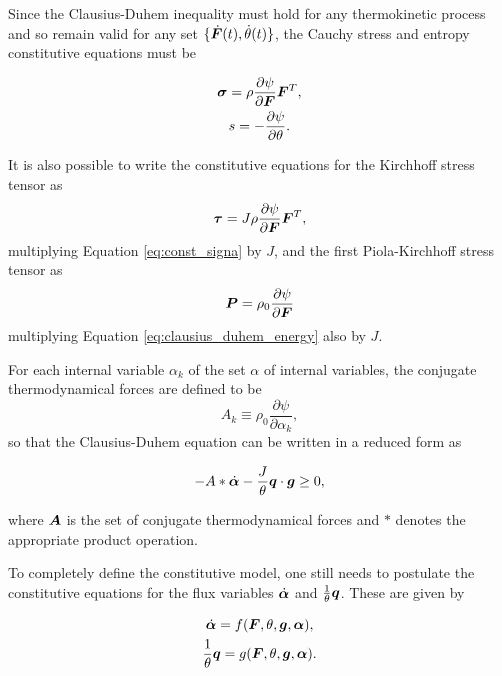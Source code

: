 Since the Clausius-Duhem inequality must hold for any thermokinetic process and so remain valid for any set $\{\dot{\bm{F}}(t),\dot \theta(t)\}$, the Cauchy stress and entropy constitutive equations must be
\begin{highlight}[innertopmargin=-5pt]
    \begin{gather}
        \bm{\sigma} = \rho \frac{\partial \psi}{\partial \bm{F}}\bm{F}^T, \label{eq:const_signa}\\
        s = -\frac{\partial \psi}{\partial \theta}.
    \end{gather}
\end{highlight}

It is also possible to write the constitutive equations for the Kirchhoff stress tensor as
\begin{equation}
    \bm{\tau} = J\rho \frac{\partial \psi}{\partial \bm{F}}\bm{F}^T,
\end{equation}
multiplying Equation \eqref{eq:const_signa} by $J$, and the first Piola-Kirchhoff stress tensor as
\begin{equation}
    \bm{P} = \rho_0 \frac{\partial \psi}{\partial \bm{F}}
\end{equation}
multiplying Equation \eqref{eq:clausius_duhem_energy} also by $J$.

For each internal variable $\alpha_k$ of the set $\alpha$ of internal variables, the conjugate thermodynamical forces are defined to be
\begin{equation}
    A_k\equiv \rho_0 \frac{\partial \psi}{\partial \alpha_k},
\end{equation}
so that the Clausius-Duhem equation can be written in a reduced form as
\begin{highlight}
    \begin{equation}
        -A*\dot{\bm{\alpha}} - \frac{J}{\theta}\bm{q}\cdot \bm{g}\geq 0,
    \end{equation}
\end{highlight}
where $\bm{A}$ is the set of conjugate thermodynamical forces and \(*\) denotes the appropriate product operation.

To completely define the constitutive model, one still needs to postulate the constitutive equations for the flux variables $\dot{\bm{\alpha}}$ and $\frac{1}{\theta}\bm{q}$.
These are given by
\begin{highlight}[innertopmargin=-5pt]
            \begin{gather}     \dot{\bm{\alpha}} = f(\bm{F}, \theta, \bm{g}, \bm{\alpha}),\\      \frac{1}{\theta}\bm{q} = g(\bm{F}, \theta, \bm{g}, \bm{\alpha}).
            \end{gather}
\end{highlight}

